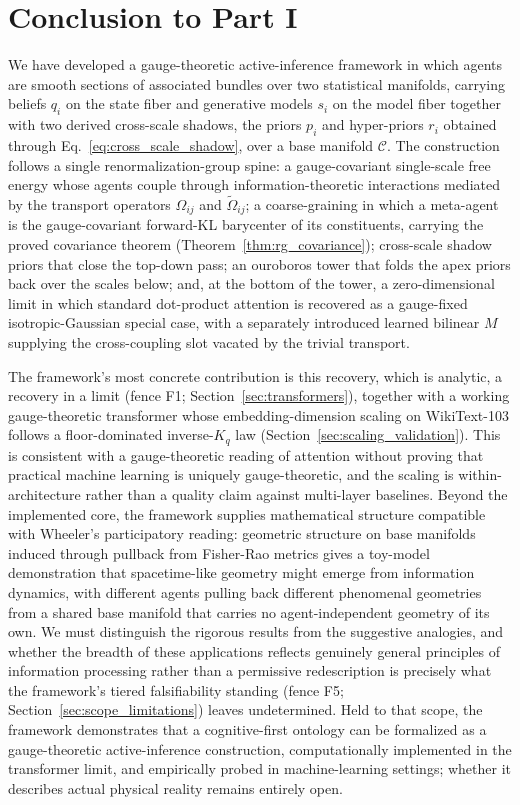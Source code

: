 \documentclass[11pt]{article}
\begin{document}
\section{Conclusion to Part I}\label{sec:conclusion}

We have developed a gauge-theoretic active-inference framework in which agents are smooth sections of associated bundles over two statistical manifolds, carrying beliefs $q_i$ on the state fiber and generative models $s_i$ on the model fiber together with two derived cross-scale shadows, the priors $p_i$ and hyper-priors $r_i$ obtained through Eq.~\eqref{eq:cross_scale_shadow}, over a base manifold $\mathcal{C}$. The construction follows a single renormalization-group spine: a gauge-covariant single-scale free energy whose agents couple through information-theoretic interactions mediated by the transport operators $\Omega_{ij}$ and $\tilde\Omega_{ij}$; a coarse-graining in which a meta-agent is the gauge-covariant forward-KL barycenter of its constituents, carrying the proved covariance theorem (Theorem~\ref{thm:rg_covariance}); cross-scale shadow priors that close the top-down pass; an ouroboros tower that folds the apex priors back over the scales below; and, at the bottom of the tower, a zero-dimensional limit in which standard dot-product attention is recovered as a gauge-fixed isotropic-Gaussian special case, with a separately introduced learned bilinear $M$ supplying the cross-coupling slot vacated by the trivial transport.

The framework's most concrete contribution is this recovery, which is analytic, a recovery in a limit (fence F1; Section~\ref{sec:transformers}), together with a working gauge-theoretic transformer whose embedding-dimension scaling on WikiText-103 follows a floor-dominated inverse-$K_q$ law (Section~\ref{sec:scaling_validation}). This is consistent with a gauge-theoretic reading of attention without proving that practical machine learning is uniquely gauge-theoretic, and the scaling is within-architecture rather than a quality claim against multi-layer baselines. Beyond the implemented core, the framework supplies mathematical structure compatible with Wheeler's participatory reading: geometric structure on base manifolds induced through pullback from Fisher-Rao metrics gives a toy-model demonstration that spacetime-like geometry might emerge from information dynamics, with different agents pulling back different phenomenal geometries from a shared base manifold that carries no agent-independent geometry of its own. We must distinguish the rigorous results from the suggestive analogies, and whether the breadth of these applications reflects genuinely general principles of information processing rather than a permissive redescription is precisely what the framework's tiered falsifiability standing (fence F5; Section~\ref{sec:scope_limitations}) leaves undetermined. Held to that scope, the framework demonstrates that a cognitive-first ontology can be formalized as a gauge-theoretic active-inference construction, computationally implemented in the transformer limit, and empirically probed in machine-learning settings; whether it describes actual physical reality remains entirely open.
\end{document}
